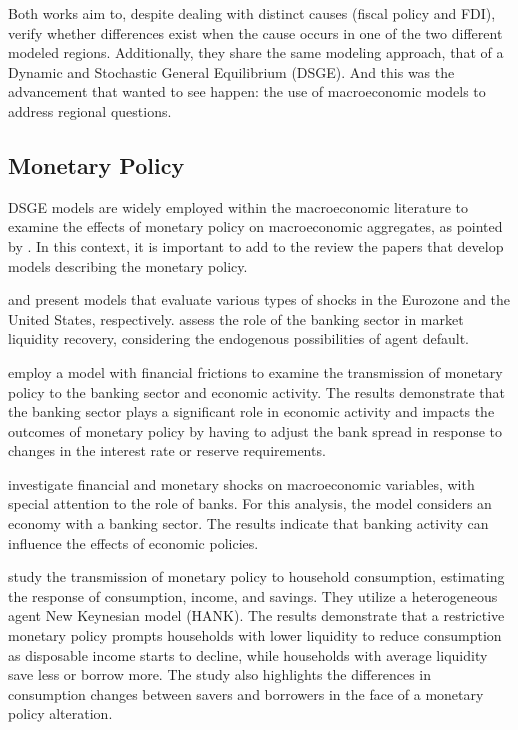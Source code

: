\documentclass[../thesis.tex]{subfiles}
\begin{document}
Both works aim to, despite dealing with distinct causes (fiscal policy and FDI), verify whether differences exist when the cause occurs in one of the two different modeled regions. Additionally, they share the same modeling approach, that of a Dynamic and Stochastic General Equilibrium (DSGE). And this was the advancement that \textcite{rickman_modern_2010} wanted to see happen: the use of macroeconomic models to address regional questions.

\subsection*{Monetary Policy}

DSGE models are widely employed within the macroeconomic literature to examine the effects of monetary policy on macroeconomic aggregates, as pointed by \textcite{gali_monetary_2015}. In this context, it is important to add to the review the papers that develop models describing the monetary policy.

\textcite{smets_estimated_2003} and \textcite{smets_shocks_2007} present models that evaluate various types of shocks in the Eurozone and the United States, respectively. \textcite{walque_financial_2010} assess the role of the banking sector in market liquidity recovery, considering the endogenous possibilities of agent default.

\textcite{vinhado_politica_2016} employ a model with financial frictions to examine the transmission of monetary policy to the banking sector and economic activity. The results demonstrate that the banking sector plays a significant role in economic activity and impacts the outcomes of monetary policy by having to adjust the bank spread in response to changes in the interest rate or reserve requirements.

\textcite{soltani_investigating_2021} investigate financial and monetary shocks on macroeconomic variables, with special attention to the role of banks. For this analysis, the model considers an economy with a banking sector. The results indicate that banking activity can influence the effects of economic policies.

\textcite{holm_transmission_2021} study the transmission of monetary policy to household consumption, estimating the response of consumption, income, and savings. They utilize a heterogeneous agent New Keynesian model (HANK). The results demonstrate that a restrictive monetary policy prompts households with lower liquidity to reduce consumption as disposable income starts to decline, while households with average liquidity save less or borrow more. The study also highlights the differences in consumption changes between savers and borrowers in the face of a monetary policy alteration.
\end{document}
